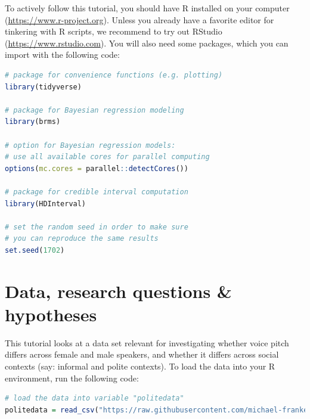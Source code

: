 \documentclass[nobib]{tufte-handout}
\begin{document}
To actively follow this tutorial, you should have R installed on your computer (\url{https://www.r-project.org}).
Unless you already have a favorite editor for tinkering with R scripts, we recommend to try out RStudio (\url{https://www.rstudio.com}).
You will also need some packages,
which you can import with the following code:

\bigskip

\begin{minipage}[]{\textwidth}
\begin{lstlisting}[language=R]
# package for convenience functions (e.g. plotting)
library(tidyverse)

# package for Bayesian regression modeling
library(brms)

# option for Bayesian regression models: 
# use all available cores for parallel computing
options(mc.cores = parallel::detectCores())

# package for credible interval computation
library(HDInterval)

# set the random seed in order to make sure 
# you can reproduce the same results
set.seed(1702)
\end{lstlisting}
\end{minipage}

\section{Data, research questions \& hypotheses}
\label{sec:data}

This tutorial looks at a data set relevant for investigating whether voice pitch differs across female and male speakers, and whether it differs across social contexts (say: informal and polite contexts).
To load the data into your R environment, run the following code:
%
%

\medskip

\begin{minipage}[]{\textwidth}
\begin{lstlisting}[language=R]
# load the data into variable "politedata"
politedata = read_csv("https://raw.githubusercontent.com/michael-franke/bayes_mixed_regression_tutorial/master/code/politeness_data.csv")
\end{lstlisting}
\end{minipage}
\end{document}
